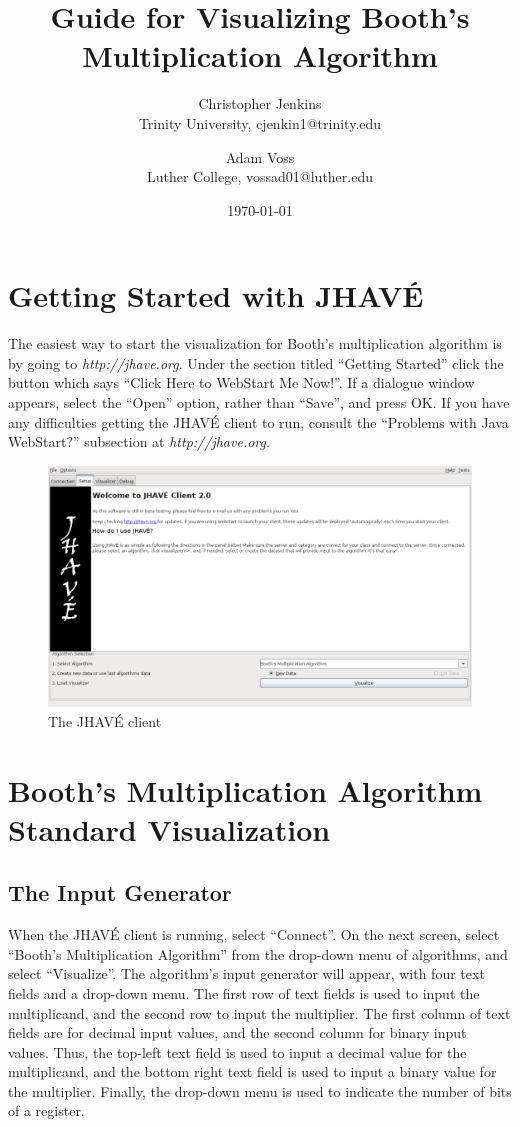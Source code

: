 \documentclass{article}
\title{Guide for Visualizing Booth's Multiplication Algorithm}
\date{\today}
\author{Christopher Jenkins\\ Trinity University, cjenkin1@trinity.edu
    \and Adam Voss\\ Luther College, vossad01@luther.edu}
\begin{document}
\maketitle
\tableofcontents

\pagebreak

\section{Getting Started with JHAVÉ}
The easiest way to start the visualization for Booth's multiplication algorithm is by going to \emph{http://jhave.org}.
Under the section titled ``Getting Started'' click the button which says ``Click Here to WebStart Me Now!''.
If a dialogue window appears, select the ``Open'' option, rather than ``Save'', and press OK.
If you have any difficulties getting the JHAVÉ client to run, consult the ``Problems with Java WebStart?'' subsection at \emph{http://jhave.org}.

\begin{figure}[h]
\centering
\includegraphics[scale=0.3]{start.pdf}
\caption{The JHAVÉ client}
\end{figure}

\pagebreak

\section{Booth's Multiplication Algorithm Standard Visualization}
\subsection{The Input Generator}

When the JHAVÉ client is running, select ``Connect''.
On the next screen, select ``Booth's Multiplication Algorithm'' from the drop-down menu of algorithms, and select ``Visualize''.
The algorithm's input generator will appear, with four text fields and a drop-down menu.
The first row of text fields is used to input the multiplicand, and the second row to input the multiplier.
The first column of text fields are for decimal input values, and the second column for binary input values.
Thus, the top-left text field is used to input a decimal value for the multiplicand, and the bottom right text field is used to input a binary value for the multiplier.
Finally, the drop-down menu is used to indicate the number of bits of a register.
\end{document}
